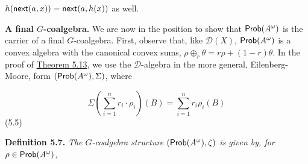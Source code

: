 \documentclass[11pt,a4paper]{amsart}
\begin{document}
\hypertarget{html:S5.SS0.SSS0.Px1.p6.m13}{}\({h(\mbox{\sf next}(a,x))=\mbox{\sf next}(a,h(x))}\) as well.
\par\medskip
\hypertarget{html:S5.SS0.SSS0.Px1.SPx1}{} \par\noindent\textbf{A final %
\hypertarget{html:S5.SS0.SSS0.Px1.SPx1.m1}{}\({G}\)-coalgebra.}\quad  %
\hypertarget{html:S5.SS0.SSS0.Px1.SPx1.p1}{} We are now in the position to show that %
\hypertarget{html:S5.SS0.SSS0.Px1.SPx1.p1.m1}{}\({\text{\sf Prob}(A^{\omega})}\) is the carrier of a final %
\hypertarget{html:S5.SS0.SSS0.Px1.SPx1.p1.m2}{}\({G}\)-coalgebra. First, observe that, like %
\hypertarget{html:S5.SS0.SSS0.Px1.SPx1.p1.m3}{}\({{\mathcal{D}}(X)}\), %
\hypertarget{html:S5.SS0.SSS0.Px1.SPx1.p1.m4}{}\({\text{\sf Prob}(A^{\omega})}\) is a convex algebra with the canonical convex sums, %
\hypertarget{html:S5.SS0.SSS0.Px1.SPx1.p1.m5}{}\({\rho\oplus_{r}\theta=r\rho+(1-r)\theta}\). In the proof of \hyperlink{html:S5.Thmtheorem13}{Theorem 5.13}, we use the %
\hypertarget{html:S5.SS0.SSS0.Px1.SPx1.p1.m6}{}\({{\mathcal{D}}}\)-algebra in the more general, Eilenberg-Moore, form %
\hypertarget{html:S5.SS0.SSS0.Px1.SPx1.p1.m7}{}\({(\text{\sf Prob}(A^{\omega}),\Sigma)}\), where
\par\medskip
\hypertarget{html:S5.E5}{}   %
\hypertarget{html:S5.E5.m1}{}\[\Sigma(\sum\limits_{i=1}^{n}r_{i}\cdot\rho_{i})(B)=\sum\limits_{i=1}^{n}r_{i}\rho_{i}(B)\]  (5.5)    %
\hypertarget{html:S5.Thmtheorem7}{} \par\noindent\textbf{\textbf{Definition 5.7}\textbf{.}}\quad  %
\hypertarget{html:S5.Thmtheorem7.p1}{} \emph{The %
\hypertarget{html:S5.Thmtheorem7.p1.m1}{}\({G}\)-coalgebra structure %
\hypertarget{html:S5.Thmtheorem7.p1.m2}{}\({(\text{\sf Prob}(A^{\omega}),\zeta)}\) is given by, for %
\hypertarget{html:S5.Thmtheorem7.p1.m3}{}\({\rho\in\text{\sf Prob}(A^{\omega})}\),}
\par\medskip
\end{document}
